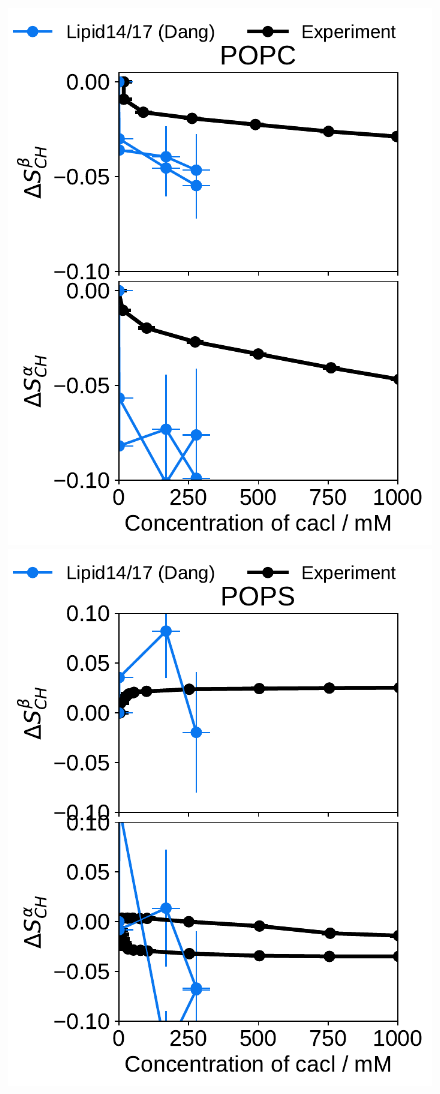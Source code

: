 \begin{figure}[htb!] 
  \centering 
  \includegraphics[width=\figwidth]{../img/ecc_pops/l17/order_parameters_changes_A-B_POPC_cacl.pdf} 
  \includegraphics[width=\figwidth]{../img/ecc_pops/l17/order_parameters_changes_A-B_POPS_cacl.pdf} 

\end{figure}
